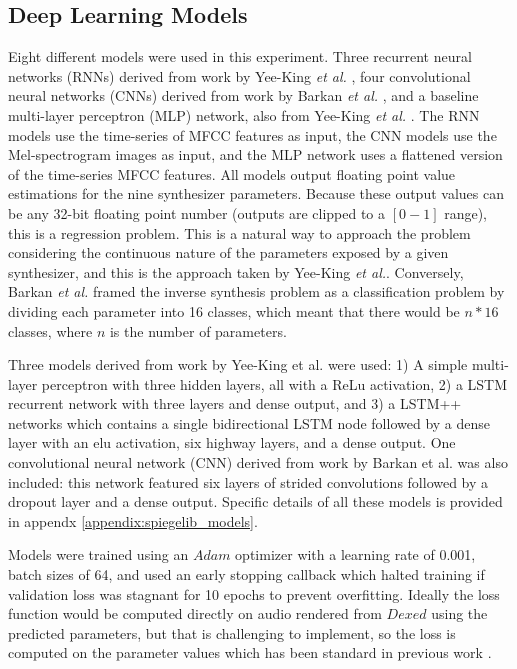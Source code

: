 \subsection{Deep Learning Models}
Eight different models were used in this experiment. Three recurrent neural networks (RNNs) derived from work by Yee-King \textit{et al.} \cite{yee2018automatic}, four convolutional neural networks (CNNs) derived from work by Barkan \textit{et al.} \cite{barkan2019inversynth}, and a baseline multi-layer perceptron (MLP) network, also from Yee-King \textit{et al.} \cite{yee2018automatic}. The RNN models use the time-series of MFCC features as input, the CNN models use the Mel-spectrogram images as input, and the MLP network uses a flattened version of the time-series MFCC features. All models output floating point value estimations for the nine synthesizer parameters. Because these output values can be any 32-bit floating point number (outputs are clipped to a $[0-1]$ range), this is a regression problem. This is a natural way to approach the problem considering the continuous nature of the parameters exposed by a given synthesizer, and this is the approach taken by Yee-King \textit{et al.}. Conversely, Barkan \textit{et al.} framed the inverse synthesis problem as a classification problem by dividing each parameter into 16 classes, which meant that there would be $n*16$ classes, where $n$ is the number of parameters.


Three models derived from work by Yee-King et al. \cite{yee2018automatic} were used: 1) A simple multi-layer perceptron with three hidden layers, all with a ReLu activation, 2) a LSTM recurrent network with three layers and dense output, and 3) a LSTM++ networks which contains a single bidirectional LSTM node followed by a dense layer with an elu activation, six highway layers, and a dense output. One convolutional neural network (CNN) derived from work by Barkan et al. \cite{barkan2019inversynth} was also included: this network featured six layers of strided convolutions followed by a dropout layer and a dense output. Specific details of all these models is provided in appendx \ref{appendix:spiegelib_models}.

Models were trained using an $Adam$ optimizer \cite{kingma2014adam} with a learning rate of 0.001, batch sizes of 64, and used an early stopping callback which halted training if validation loss was stagnant for 10 epochs to prevent overfitting. Ideally the loss function would be computed directly on audio rendered from $Dexed$ using the predicted parameters, but that is challenging to implement, so the loss is computed on the parameter values which has been standard in previous work \cite{yee2018automatic, barkan2019inversynth}.


